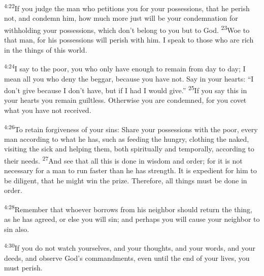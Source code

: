\documentclass[openany,12pt,english]{book}
\newenvironment{para}{\par\pretolerance=100\tolerance=200\setlength{\emergencystretch}{0.6em}\relax}{\par}
\begin{document}
\begin{para}
    \textsuperscript{4:22}\thinspace{}If you judge the man who petitions you for your possessions, that he per\-ish not, and con\-demn him, how much more just will be your con\-dem\-na\-tion for with\-hold\-ing your possessions, which don't be\-long to you but to God.
    \textsuperscript{23}\thinspace{}Woe to that man, for his possessions will per\-ish with him. I speak to those who are rich in the things of this world.
\end{para}

\begin{para}
    \textsuperscript{4:24}\thinspace{}I say to the poor, you who on\-ly have e\-nough to re\-main from day to day; I mean all you who de\-ny the beg\-gar, be\-cause you have not. Say in your hearts: “I don't give be\-cause I don't have, but if I had I would give.”
    \textsuperscript{25}\thinspace{}If you say this in your hearts you re\-main guilt\-less. Oth\-er\-wise you are condemned, for you cov\-et what you have not re\-ceived.
\end{para}

\begin{para}
    \textsuperscript{4:26}\thinspace{}To re\-tain for\-give\-ness of your sins: Share your possessions with the poor, eve\-ry man ac\-cord\-ing to what he has, such as feed\-ing the hun\-gry, cloth\-ing the na\-ked, visiting the sick and help\-ing them, both spiritually and tem\-po\-ral\-ly, ac\-cord\-ing to their needs.
    \textsuperscript{27}\thinspace{}And see that all this is done in wis\-dom and or\-der; for it is not nec\-es\-sar\-y for a man to run faster than he has strength. It is ex\-pe\-di\-ent for him to be dil\-i\-gent, that he might win the prize. There\-fore, all things must be done in or\-der.
\end{para}

\begin{para}
    \textsuperscript{4:28}\thinspace{}Re\-mem\-ber that who\-ev\-er borrows from his neigh\-bor should re\-turn the thing, as he has a\-greed, or else you will sin; and per\-haps you will cause your neigh\-bor to sin al\-so.
\end{para}

\begin{para}
    \textsuperscript{4:30}\thinspace{}If you do not watch your\-selves, and your thoughts, and your words, and your deeds, and ob\-serve God's commandments, e\-ven un\-til the end of your lives, you must per\-ish.
\end{para}
\end{document}
